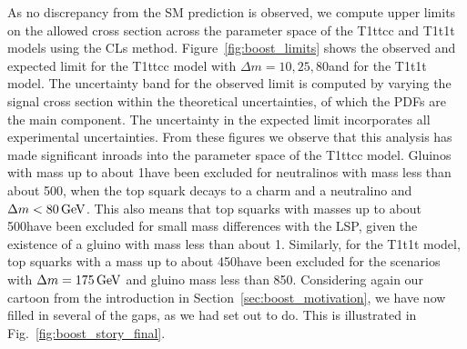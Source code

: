 As no discrepancy from the SM prediction is observed, we compute upper limits on the allowed
cross section across the parameter space of the T1ttcc and T1t1t models using the CLs method.
Figure~\ref{fig:boost_limits} shows the observed and expected limit for the T1ttcc model with
$\Delta m=10,25,80$\GeV and for the T1t1t model. 
The uncertainty band for the observed limit is computed by varying the signal cross section within
the theoretical uncertainties, of which the PDFs are the main component. The uncertainty in the
expected limit incorporates all experimental uncertainties. 
From these figures we observe that this analysis has made significant inroads into the parameter
space of the T1ttcc model. 
Gluinos with mass up to about 1\TeV have been excluded for neutralinos with mass less than about
500\GeV, when the top squark decays to a charm and a neutralino and $\Delta m < 80\,\text{Ge\hspace{-.08em}V}$. This also
means that top squarks with masses up to about 500\GeV have been excluded for small mass
differences with the LSP, given the existence of a gluino with mass less than about 1\TeV. 
Similarly, for the T1t1t model, top squarks with a mass up to about 450\GeV have been excluded
for the scenarios with $\Delta m = 175\,\text{Ge\hspace{-.08em}V}$ and gluino mass less than 850\GeV.
Considering again our cartoon from the introduction in Section~\ref{sec:boost_motivation}, we have
now filled in several of the gaps, as we had set out to do. This is illustrated in
Fig.~\ref{fig:boost_story_final}. 


